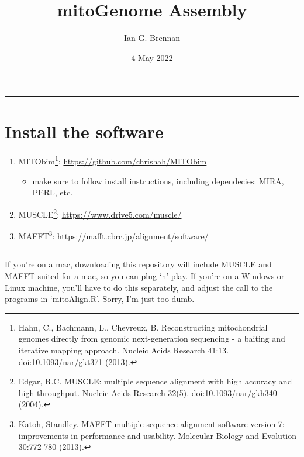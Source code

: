 \documentclass[
]{article}
\title{mitoGenome Assembly}
\author{Ian G. Brennan}
\date{4 May 2022}
\providecommand{\tightlist}{%
  \setlength{\itemsep}{0pt}\setlength{\parskip}{0pt}}
\begin{document}
\maketitle

{
\setcounter{tocdepth}{2}
\tableofcontents
}
\begin{center}\rule{0.5\linewidth}{0.5pt}\end{center}

\pagebreak

\hypertarget{install-the-software}{%
\section{Install the software}\label{install-the-software}}

\begin{enumerate}
\def\labelenumi{\arabic{enumi}.}
\tightlist
\item
  MITObim\footnote{Hahn, C., Bachmann, L., Chevreux, B. Reconstructing
    mitochondrial genomes directly from genomic next-generation
    sequencing - a baiting and iterative mapping approach. Nucleic Acids
    Research 41:13. \url{doi:10.1093/nar/gkt371} (2013).}:
  \url{https://github.com/chrishah/MITObim}

  \begin{itemize}
  \tightlist
  \item
    make sure to follow install instructions, including dependecies:
    MIRA, PERL, etc.
  \end{itemize}
\item
  MUSCLE\footnote{Edgar, R.C. MUSCLE: multiple sequence alignment with
    high accuracy and high throughput. Nucleic Acids Research 32(5).
    \url{doi:10.1093/nar/gkh340} (2004).}:
  \url{https://www.drive5.com/muscle/}
\item
  MAFFT\footnote{Katoh, Standley. MAFFT multiple sequence alignment
    software version 7: improvements in performance and usability.
    Molecular Biology and Evolution 30:772-780 (2013).}:
  \url{https://mafft.cbrc.jp/alignment/software/}
\end{enumerate}

\begin{center}\rule{0.5\linewidth}{0.5pt}\end{center}

If you're on a mac, downloading this repository will include MUSCLE and
MAFFT suited for a mac, so you can plug `n' play. If you're on a Windows
or Linux machine, you'll have to do this separately, and adjust the call
to the programs in `mitoAlign.R'. Sorry, I'm just too dumb.
\end{document}
